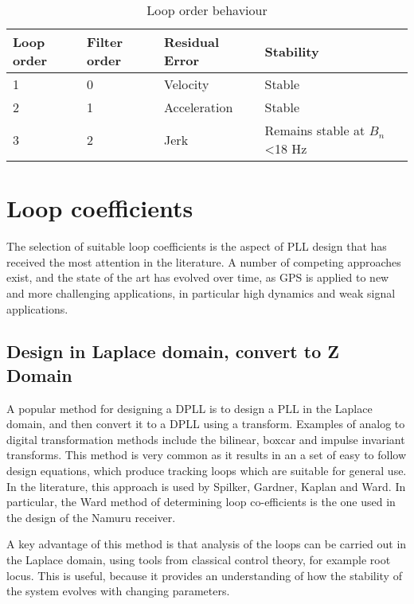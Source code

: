 \begin{table}[!htb]
\centering
\begin{tabular}{|l|l|l|l|}
\hline
\rowcolor[HTML]{C0C0C0} 
Loop order & Filter order & Residual Error & Stability                               \\ \hline
1          & 0            & Velocity       & Stable                                  \\ \hline
\rowcolor[HTML]{EFEFEF} 
2          & 1            & Acceleration   & Stable                                  \\ \hline
3          & 2            & Jerk           & Remains stable at $B_n$ \textless 18 Hz \\ \hline
\end{tabular}
\caption{Loop order behaviour}
\label{table:LoopOrders}
\end{table}

\section{Loop coefficients}

The selection of suitable loop coefficients is the aspect of \ac{PLL} design that has received the most attention in the literature. A number of competing approaches exist, and the state of the art has evolved over time, as \ac{GPS} is applied to new and more challenging applications, in particular high dynamics and weak signal applications.

\subsection{Design in Laplace domain, convert to Z Domain}
A popular method for designing a \ac{DPLL} is to design a \ac{PLL} in the Laplace domain, and then convert it to a \ac{DPLL} using a transform. Examples of analog to digital transformation methods include the bilinear, boxcar and impulse invariant transforms. This method is very common as it results in an a set of easy to follow design equations, which produce tracking loops which are suitable for general use. In the literature, this approach is used by Spilker\cite{Spilker}, Gardner\cite{Gardner}, Kaplan\cite{Kaplan} and Ward\cite{Ward}. In particular, the Ward method of determining loop co-efficients is the one used in the design of the Namuru receiver.

A key advantage of this method is that analysis of the loops can be carried out in the Laplace domain, using tools from classical control theory, for example root locus\cite{Nise}. This is useful, because it provides an understanding of how the stability of the system evolves with changing parameters. 

